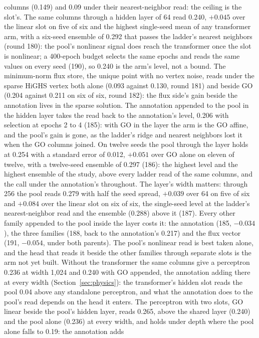columns (0.149) and 0.09 under their nearest-neighbor read: the ceiling is the slot's.
The same columns through a hidden layer of 64 read 0.240, $+0.045$ over the linear
slot on five of six and the highest single-seed mean of any transformer arm, with a
six-seed ensemble of 0.292 that passes the ladder's nearest neighbors (round 180): the
pool's nonlinear signal does reach the transformer once the slot is nonlinear; a
400-epoch budget selects the same epochs and reads the same values on every seed
(190), so 0.240 is the arm's level, not a bound. The minimum-norm flux
store, the unique point with no vertex noise, reads under the sparse HiGHS vertex both
alone (0.093 against 0.130, round 181) and beside GO (0.204 against 0.211 on six of six,
round 182): the flux side's gain beside the annotation lives in the sparse solution.
The annotation appended to the pool in the hidden layer takes the read back to the
annotation's level, 0.206 with selection at epochs 2 to 4 (185): with GO in the layer
the arm is the GO affine, and the pool's gain is gone, as the ladder's ridge and
nearest neighbors lost it when the GO columns joined. On twelve seeds the pool through
the layer holds at 0.254 with a standard error of 0.012, $+0.051$ over GO alone on
eleven of twelve, with a twelve-seed ensemble of 0.297 (186): the highest level and
the highest ensemble of the study, above every ladder read of the same columns, and
the call under the annotation's throughout. The layer's width matters: through 256 the
pool reads 0.279 with half the seed spread, $+0.039$ over 64 on five of six and
$+0.084$ over the linear slot on six of six, the single-seed level at the ladder's
nearest-neighbor read and the ensemble (0.288) above it (187). Every other family
appended to the pool inside the layer costs it: the annotation (185, $-0.034$), the
three families (188, back to the annotation's 0.217) and the flux vector (191,
$-0.054$, under both parents). The pool's nonlinear read is best taken alone, and the
head that reads it beside the other families through separate slots is the arm not yet
built. Without the transformer the same columns give a perceptron 0.236 at width 1,024
and 0.240 with GO appended, the annotation adding there at every width
(Section~\ref{sec:physics}): the transformer's hidden slot reads the pool 0.04 above
any standalone perceptron, and what the annotation does to the pool's read depends on
the head it enters. The perceptron with two slots, GO linear beside the pool's hidden
layer, reads 0.265, above the shared layer (0.240) and the pool alone (0.236) at every
width, and holds under depth where the pool alone falls to 0.19: the annotation adds
